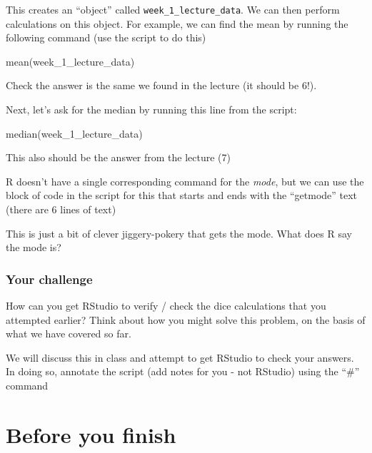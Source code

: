 \documentclass[
]{book}
\newenvironment{Shaded}{\begin{snugshade}}{\end{snugshade}}
\newcommand{\FunctionTok}[1]{\textcolor[rgb]{0.00,0.00,0.00}{#1}}
\newcommand{\NormalTok}[1]{#1}
\begin{document}
This creates an ``object'' called \texttt{week\_1\_lecture\_data}. We can then perform calculations on this object. For example, we can find the mean by running the following command (use the script to do this)

\begin{Shaded}
\begin{Highlighting}[]
\FunctionTok{mean}\NormalTok{(week\_1\_lecture\_data)}
\end{Highlighting}
\end{Shaded}

Check the answer is the same we found in the lecture (it should be 6!).

Next, let's ask for the median by running this line from the script:

\begin{Shaded}
\begin{Highlighting}[]
\FunctionTok{median}\NormalTok{(week\_1\_lecture\_data)}
\end{Highlighting}
\end{Shaded}

This also should be the answer from the lecture (7)

R doesn't have a single corresponding command for the \emph{mode}, but we can use the block of code in the script for this that starts and ends with the ``getmode'' text (there are 6 lines of text)

This is just a bit of clever jiggery-pokery that gets the mode. What does R say the mode is?

\hypertarget{your-challenge}{%
\subsubsection{Your challenge}\label{your-challenge}}

How can you get RStudio to verify / check the dice calculations that you attempted earlier? Think about how you might solve this problem, on the basis of what we have covered so far.

We will discuss this in class and attempt to get RStudio to check your answers. In doing so, annotate the script (add notes for you - not RStudio) using the ``\#'' command

\hypertarget{before-you-finish}{%
\section{Before you finish}\label{before-you-finish}}
\end{document}
